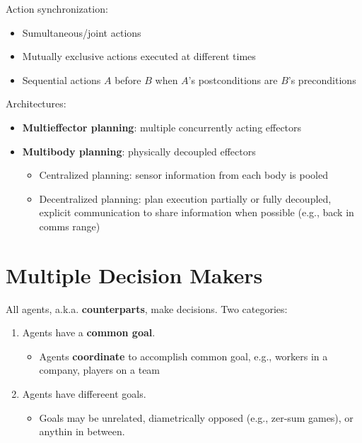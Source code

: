 \documentclass[11pt]{article}
\begin{document}
Action synchronization:

\begin{itemize}
\item Sumultaneous/joint actions
\item Mutually exclusive actions executed at different times
\item Sequential actions \(A\) before \(B\) when \(A\)'s postconditions are \(B\)'s preconditions
\end{itemize}

Architectures:

\begin{itemize}
\item \textbf{Multieffector planning}: multiple concurrently acting effectors
\item \textbf{Multibody planning}: physically decoupled effectors

\begin{itemize}
\item Centralized planning: sensor information from each body is pooled
\item Decentralized planning: plan execution partially or fully decoupled, explicit communication to share information when possible (e.g., back in comms range)
\end{itemize}
\end{itemize}
\section{Multiple Decision Makers}
\label{sec:org0f4134c}

All agents, a.k.a. \textbf{counterparts}, make decisions.  Two categories:

\begin{enumerate}
\item Agents have a \textbf{common goal}.

\begin{itemize}
\item Agents \textbf{coordinate} to accomplish common goal, e.g., workers in a company, players on a team
\end{itemize}

\item Agents have differeent goals.

\begin{itemize}
\item Goals may be unrelated, diametrically opposed (e.g., zer-sum games), or anythin in between.
\end{itemize}
\end{enumerate}
\end{document}
